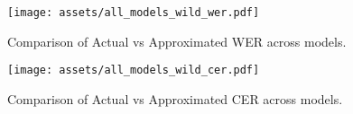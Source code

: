 \begin{figure*}
    \centering
    \texttt{[image: assets/all\_models\_wild\_wer.pdf]}
    \caption{Comparison of Actual vs Approximated WER across models.}
    \label{fig:enter-label}
\end{figure*}
\begin{figure*}
    \centering
    \texttt{[image: assets/all\_models\_wild\_cer.pdf]}
    \caption{Comparison of Actual vs Approximated CER across models.}
    \label{fig:benchmark}
\end{figure*}

